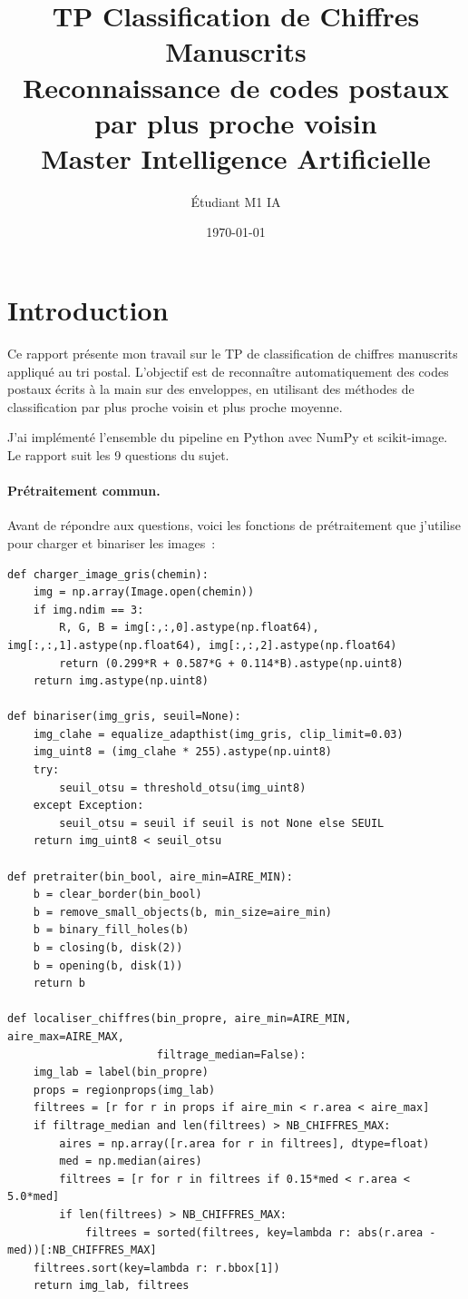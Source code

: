 \documentclass[a4paper,11pt]{article}
\title{\textbf{TP Classification de Chiffres Manuscrits}\\
\large Reconnaissance de codes postaux par plus proche voisin\\[0.5cm]
\normalsize Master Intelligence Artificielle}
\author{Étudiant M1 IA}
\date{\today}
\begin{document}
\maketitle
\tableofcontents
\newpage

\section{Introduction}

Ce rapport présente mon travail sur le TP de classification de chiffres manuscrits appliqué au tri postal. L'objectif est de reconnaître automatiquement des codes postaux écrits à la main sur des enveloppes, en utilisant des méthodes de classification par plus proche voisin et plus proche moyenne.

J'ai implémenté l'ensemble du pipeline en Python avec NumPy et scikit-image. Le rapport suit les 9 questions du sujet.

\paragraph{Prétraitement commun.} Avant de répondre aux questions, voici les fonctions de prétraitement que j'utilise pour charger et binariser les images~:

\begin{lstlisting}[style=python, caption={Fonctions de prétraitement.}]
def charger_image_gris(chemin):
    img = np.array(Image.open(chemin))
    if img.ndim == 3:
        R, G, B = img[:,:,0].astype(np.float64), img[:,:,1].astype(np.float64), img[:,:,2].astype(np.float64)
        return (0.299*R + 0.587*G + 0.114*B).astype(np.uint8)
    return img.astype(np.uint8)

def binariser(img_gris, seuil=None):
    img_clahe = equalize_adapthist(img_gris, clip_limit=0.03)
    img_uint8 = (img_clahe * 255).astype(np.uint8)
    try:
        seuil_otsu = threshold_otsu(img_uint8)
    except Exception:
        seuil_otsu = seuil if seuil is not None else SEUIL
    return img_uint8 < seuil_otsu

def pretraiter(bin_bool, aire_min=AIRE_MIN):
    b = clear_border(bin_bool)
    b = remove_small_objects(b, min_size=aire_min)
    b = binary_fill_holes(b)
    b = closing(b, disk(2))
    b = opening(b, disk(1))
    return b

def localiser_chiffres(bin_propre, aire_min=AIRE_MIN, aire_max=AIRE_MAX,
                       filtrage_median=False):
    img_lab = label(bin_propre)
    props = regionprops(img_lab)
    filtrees = [r for r in props if aire_min < r.area < aire_max]
    if filtrage_median and len(filtrees) > NB_CHIFFRES_MAX:
        aires = np.array([r.area for r in filtrees], dtype=float)
        med = np.median(aires)
        filtrees = [r for r in filtrees if 0.15*med < r.area < 5.0*med]
        if len(filtrees) > NB_CHIFFRES_MAX:
            filtrees = sorted(filtrees, key=lambda r: abs(r.area - med))[:NB_CHIFFRES_MAX]
    filtrees.sort(key=lambda r: r.bbox[1])
    return img_lab, filtrees
\end{lstlisting}
\end{document}

